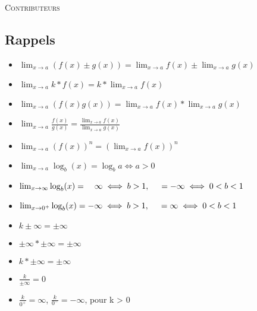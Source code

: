 \documentclass[10pt, french]{article}
\begin{document}
\begin{center}
	\textsc{\Large Contributeurs}\\[0.5cm] 
\end{center}

\newpage

\raggedcolumns

\begin{multicols*}{2}

\section{Rappels}

\begin{conceptgen_enhanced}
\begin{itemize}
  \item $\lim_{x \to a}  (f(x) \pm g(x)) = \lim_{x \to a} f(x) \pm \lim_{x \to a} g(x)$ 
  \item $\lim_{x\to a} k*f(x) = k*\lim_{x\to a} f(x)$
  \item $\lim_{x\to a} (f(x)g(x)) = \lim_{x\to a} f(x)*\lim_{x\to a} g(x)$
  \item $\lim_{x\to a} \frac{f(x)}{g(x)} = \frac{\lim_{x\to a} f(x)}{\lim_{x\to a} g(x)}$
  \item $\lim_{x\to a} (f(x))^{n} = (\lim_{x\to a} f(x))^{n}$
  \item $\lim_{x\to a} \log_b (x) = \log_b{a} \iff a > 0$
  \item $\lim_{x\to \infty} \log_b (x) = \hspace{0.35cm}\infty \iff b > 1, \hspace{0.5cm}=-\infty \iff 0 < b < 1$
  \item $\lim_{x\to 0^{+}} \log_b (x) = -\infty \iff b > 1, \hspace{0.5cm}=\infty \iff 0 < b < 1$
\end{itemize}
\end{conceptgen_enhanced}

\begin{conceptgen_enhanced}
\begin{itemize}
 \item $k \pm \infty = \pm \infty$
 \item $\pm \infty * \pm \infty = \pm \infty$
 \item $k * \pm \infty = \pm \infty$
 \item $\frac{k}{\pm \infty} = 0$
 \item $\frac{k}{0^{+}} = \infty$, $\frac{k}{0^{-}} = -\infty$, pour k > 0
\end{itemize}
\end{conceptgen_enhanced}


\end{multicols*}
\end{document}
